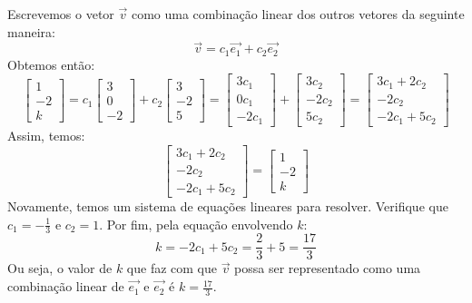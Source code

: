 \begin{resol}
 Escrevemos o vetor $\vec{v}$ como uma combinação linear dos outros vetores da seguinte maneira:
\begin{equation}
\vec{v} = c_1\vec{e_1} + c_2\vec{e_2}
\end{equation}
Obtemos então:
\begin{equation}
\left[
  \begin{array}{c}
  1 \\
  -2 \\
  k
 \end{array}
\right] =
c_1\left[
  \begin{array}{c}
  3 \\
  0 \\
  -2
 \end{array}
\right] +
c_2\left[
  \begin{array}{c}
  3 \\
  -2 \\
  5
 \end{array}
\right] =
\left[
  \begin{array}{c}
  3c_1 \\
  0c_1 \\
  -2c_1
 \end{array}
\right] +
\left[
  \begin{array}{c}
  3c_2 \\
  -2c_2 \\
  5c_2
 \end{array}
\right] = 
\left[
\begin{array}{c}
 3c_1 + 2c_2 \\
 -2c_2 \\
 -2c_1+5c_2
\end{array}
\right]
\end{equation}
Assim, temos:
\begin{equation}
\left[
\begin{array}{c}
 3c_1 + 2c_2 \\
 -2c_2 \\
 -2c_1+5c_2
\end{array}
\right] = 
\left[
 \begin{array}{c}
  1 \\
  -2 \\
  k
 \end{array}
\right]
\end{equation}
Novamente, temos um sistema de equações lineares para resolver. Verifique que $c_1 = -\frac{1}{3}$ e $c_2 = 1$. Por fim, pela equação envolvendo $k$:
\begin{equation}
 k = -2c_1+5c_2 = \frac{2}{3} + 5 = \frac{17}{3}
\end{equation}
Ou seja, o valor de $k$ que faz com que $\vec{v}$ possa ser representado como uma combinação linear de $\vec{e_1}$ e $\vec{e_2}$ é $k = \frac{17}{3}$. 
\end{resol}



